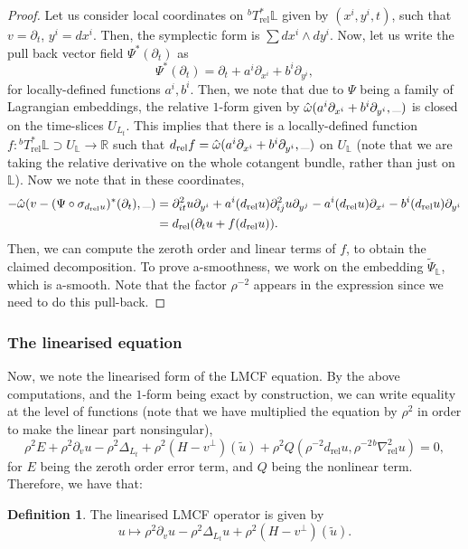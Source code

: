 \documentclass[10pt, a4paper]{article}
\theoremstyle{plain}%
\theoremstyle{definition}
\newtheorem{defn}[theorem]{Definition}
\numberwithin{figure}{section}
\numberwithin{equation}{section}
\newcommand{\bL}{\mathbb{L}}
\newcommand{\bR}{\mathbb{R}}
\newcommand{\pa}{\partial}
\newcommand{\rt}{\rightarrow}
\newcommand{\dr}{d_\mathrm{rel}}
\newcommand{\tu}{\tilde{u}}
\newcommand{\tpsil}{\tilde{\Psi}_\bL}
\newcommand{\rel}{\mathrm{rel}}
\begin{document}
\begin{proof}

	Let us  consider local coordinates on $^bT^*_\rel\bL$ given by $(x^i,y^i,t)$, such that $v=\pa_t$, $y^i=dx^i$. Then, the symplectic form is $\sum dx^i\wedge dy^i$. Now, let us write the pull back vector field $\Psi^*(\pa_t)$ as \[
	\Psi^*(\pa_t) = \pa_t + a^i\pa_{x^i}+b^i\pa_{y^i}, 
	\]
	for locally-defined functions $a^i,b^i$. Then, we note that due to $\Psi$ being a family of Lagrangian embeddings, the relative $1$-form given by $\hat{\omega}(a^i\pa_{x^i}+b^i\pa_{y^i}, \rule{0.25cm}{0.05mm})$ is closed on the time-slices $U_{L_t}$. This implies that there is a locally-defined function $f: {^bT^*_\rel\bL}\supset U_\bL \rt \bR$ such that $d_\rel f = \hat{\omega}(a^i\pa_{x^i}+b^i\pa_{y^i}, \rule{0.25cm}{0.05mm})$ on $U_\bL$ (note that we are taking the relative derivative on the whole cotangent bundle, rather than just on $\bL$).
	Now we note that in these coordinates,
	\begin{equation}
		\begin{split}
	-\hat{\omega}(v- {(\Psi\circ \sigma_{\dr u})^*(\partial_t)}, \rule{0.25cm}{0.05mm} ) &= \pa^2_{it}u\pa_{y^i}+a^i(d_\rel u)\pa^2_{ij}u\pa_{y^j}-a^i(d_\rel u)\pa_{x^i} - b^i(d_\rel u)\pa_{y^i}\\
	&= d_\rel(\pa_t u + f(d_\rel u)).
	\end{split}
	\end{equation}
	Then, we can compute the zeroth order and linear terms of $f$, to obtain the claimed decomposition. To prove a-smoothness, we work on the embedding $\tpsil$, which is a-smooth. Note that the factor $\rho^{-2}$ appears in the expression since we need to do this pull-back.
\end{proof}


\subsubsection{The linearised equation }


Now, we note the linearised form of the LMCF equation. By the above computations, and the $1$-form being exact by construction, we can write equality at the level of functions (note that we have multiplied the equation by $\rho^2$ in order to make the linear part nonsingular),
 \begin{equation}\label{eq_potentialequation}
\rho^2E + \rho^2\pa_vu - \rho^2\Delta_{L_t} + \rho^2(H-v^\perp)(\tu) +\rho^2Q(\rho^{-2}d_\mathrm{rel}u,\rho^{-2}{^b\nabla_\mathrm{rel}^2u}) = 0,
\end{equation}
for $E$ being the zeroth order error term, and $Q$ being the nonlinear term. Therefore, we have that: 
\begin{defn}
	The linearised LMCF operator is given by \begin{equation}\label{eq_mapping}
	u \mapsto \rho^2\pa_vu - \rho^2\Delta_{L_t}u+ \rho^2(H-v^\perp)(\tu).
	\end{equation}	
\end{defn}
\end{document}
